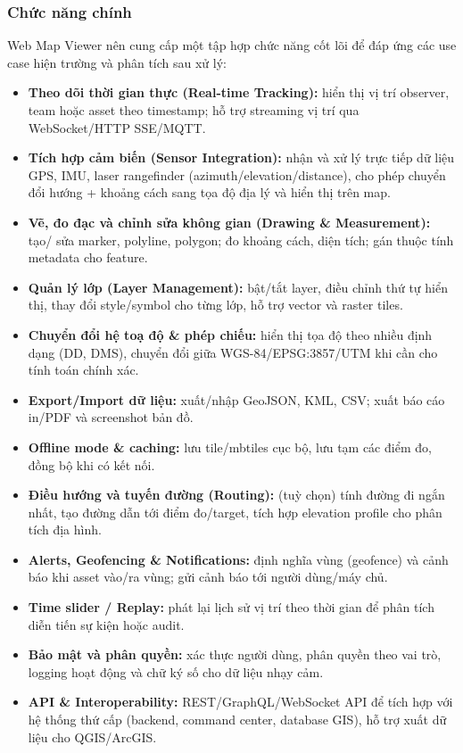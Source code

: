 \begin{itemize}
\subsubsection{Chức năng chính}
Web Map Viewer nên cung cấp một tập hợp chức năng cốt lõi để đáp ứng các use case hiện trường và phân tích sau xử lý:
\begin{itemize}
    \item \textbf{Theo dõi thời gian thực (Real-time Tracking):} hiển thị vị trí observer, team hoặc asset theo timestamp; hỗ trợ streaming vị trí qua WebSocket/HTTP SSE/MQTT.
    \item \textbf{Tích hợp cảm biến (Sensor Integration):} nhận và xử lý trực tiếp dữ liệu GPS, IMU, laser rangefinder (azimuth/elevation/distance), cho phép chuyển đổi hướng + khoảng cách sang tọa độ địa lý và hiển thị trên map.
    \item \textbf{Vẽ, đo đạc và chỉnh sửa không gian (Drawing \& Measurement):} tạo/ sửa marker, polyline, polygon; đo khoảng cách, diện tích; gán thuộc tính metadata cho feature.
    \item \textbf{Quản lý lớp (Layer Management):} bật/tắt layer, điều chỉnh thứ tự hiển thị, thay đổi style/symbol cho từng lớp, hỗ trợ vector và raster tiles.
    \item \textbf{Chuyển đổi hệ toạ độ \& phép chiếu:} hiển thị tọa độ theo nhiều định dạng (DD, DMS), chuyển đổi giữa WGS-84/EPSG:3857/UTM khi cần cho tính toán chính xác.
    \item \textbf{Export/Import dữ liệu:} xuất/nhập GeoJSON, KML, CSV; xuất báo cáo in/PDF và screenshot bản đồ.
    \item \textbf{Offline mode \& caching:} lưu tile/mbtiles cục bộ, lưu tạm các điểm đo, đồng bộ khi có kết nối.
    \item \textbf{Điều hướng và tuyến đường (Routing):} (tuỳ chọn) tính đường đi ngắn nhất, tạo đường dẫn tới điểm đo/target, tích hợp elevation profile cho phân tích địa hình.
    \item \textbf{Alerts, Geofencing \& Notifications:} định nghĩa vùng (geofence) và cảnh báo khi asset vào/ra vùng; gửi cảnh báo tới người dùng/máy chủ.
    \item \textbf{Time slider / Replay:} phát lại lịch sử vị trí theo thời gian để phân tích diễn tiến sự kiện hoặc audit.
    \item \textbf{Bảo mật và phân quyền:} xác thực người dùng, phân quyền theo vai trò, logging hoạt động và chữ ký số cho dữ liệu nhạy cảm.
    \item \textbf{API \& Interoperability:} REST/GraphQL/WebSocket API để tích hợp với hệ thống thứ cấp (backend, command center, database GIS), hỗ trợ xuất dữ liệu cho QGIS/ArcGIS.
\end{itemize}

\end{itemize}
